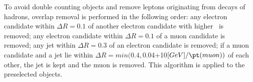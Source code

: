 To avoid double counting objects and remove leptons originating from decays of hadrons, overlap removal is performed in the following order: any electron candidate within $\Delta R = 0.1$ of another electron candidate with higher \pt\ is removed; any electron candidate within $\Delta R = 0.1$ of a muon candidate is removed; any jet within $\Delta R = 0.3$ of an electron candidate is removed; if a muon candidate and a jet lie within $\Delta R = min(0.4, $0.04+10$[GeV]/\pt(muon))$ of each other, the jet is kept and the muon is removed. This algorithm is applied to the preselected objects. 

